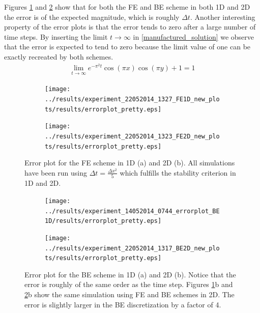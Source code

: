 Figures \ref{analysis:errorplots:FE} and \ref{analysis:errorplots:BE} show that for both the FE and BE scheme in both 1D and 2D the error is of the expected magnitude, which is roughly $\Delta t$. 
Another interesting property of the error plots is that the error tends to zero after a large number of time steps. 
By inserting the limit $t\to\infty$ in \eqref{manufactured_solution} we observe that the error is expected to tend to zero because the limit value of one can be exactly recreated by both schemes.
\begin{align*}
 \lim_{t\to\infty} e^{-\pi^2t}\cos(\pi x)\cos(\pi y) +1 = 1
\end{align*}

\begin{figure}[H]
 \centering
 \begin{subfigure}{0.49\textwidth}
  \texttt{[image: ../results/experiment\_22052014\_1327\_FE1D\_new\_plots/results/errorplot\_pretty.eps]}
  \caption{}
 \end{subfigure}
 \begin{subfigure}{0.49\textwidth}
  \texttt{[image: ../results/experiment\_22052014\_1323\_FE2D\_new\_plots/results/errorplot\_pretty.eps]}
  \caption{}
 \end{subfigure}
 \caption[Error plots FE]{Error plot for the FE scheme in 1D (a) and 2D (b). All simulations have been run using $\Delta t = \frac{\Delta x^2}{5}$ which fulfills the stability criterion in 1D and 2D.}
 \label{analysis:errorplots:FE}
\end{figure}


\begin{figure}[H]
\centering
 \begin{subfigure}{0.49\textwidth}
  \texttt{[image: ../results/experiment\_14052014\_0744\_errorplot\_BE1D/results/errorplot\_pretty.eps]}
  \caption{}
 \end{subfigure}
 \begin{subfigure}{0.49\textwidth}
  \texttt{[image: ../results/experiment\_22052014\_1317\_BE2D\_new\_plots/results/errorplot\_pretty.eps]}
  \caption{}
 \end{subfigure}
 \caption[Error plots BE]{Error plot for the BE scheme in 1D (a) and 2D (b). Notice that the error is roughly of the same order as the time step. Figures \ref{analysis:errorplots:FE}b and \ref{analysis:errorplots:BE}b show the same simulation using FE and BE schemes in 2D. The error is slightly larger in the BE discretization by a factor of 4.}
 \label{analysis:errorplots:BE}
\end{figure}


